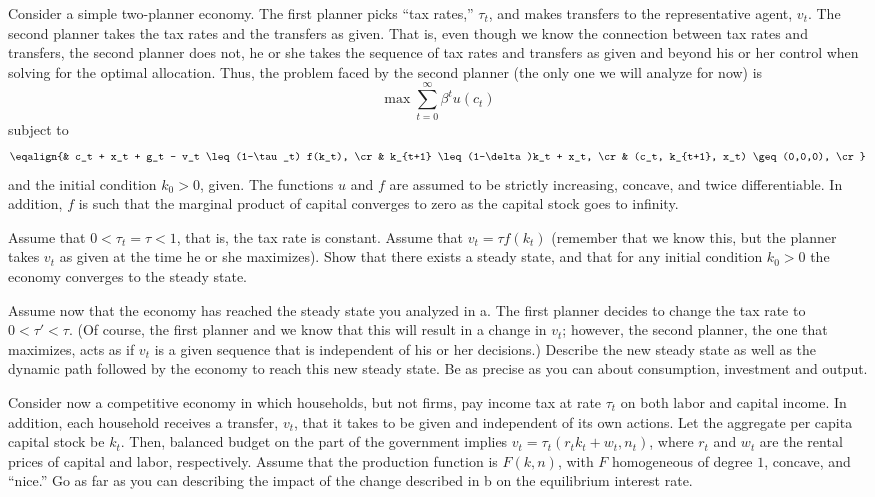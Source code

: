 \medskip
\noindent
Consider a simple two-planner economy.  The first planner picks ``tax rates,''
$\tau_t$,
and makes transfers to the representative
agent, $v_t$.
The second planner takes the tax rates and
the transfers as given.  That is, even though we know the connection between
tax rates and transfers, the second planner does not, he or she takes the sequence
of tax rates and transfers as given and beyond his or her control when solving for
the optimal allocation.  Thus, the problem faced by the second planner (the only
one we will analyze for now) is
$$ \max \sum_{t=0}^\infty \beta^t u(c_t)  $$
subject to
$$\eqalign{& c_t + x_t + g_t - v_t \leq (1-\tau_t) f(k_t), \cr
& k_{t+1} \leq (1-\delta)k_t + x_t,  \cr
& (c_t, k_{t+1}, x_t) \geq (0,0,0),  \cr}  $$
and the initial condition $k_0>0$, given.
The functions $u$ and $f$ are assumed to be strictly increasing,
concave, and twice differentiable.  In addition,
$f$ is such that the marginal product of capital converges to
zero as the capital stock goes to infinity.

\medskip

 Assume that $0<\tau_t = \tau<1$, that is, the tax rate is constant.
Assume that $v_t = \tau f(k_t)$ (remember that we know this,
but the planner takes
$v_t$ as given at the time he or she maximizes).  Show that there exists a steady
state, and that for any initial condition $k_0>0$ the economy converges to the
steady state.
\medskip

 Assume now that the economy has reached
the steady state you analyzed
in a.  The first planner decides to change the tax
rate to $0<\tau' < \tau$.
(Of course, the first planner and we know that this
 will result in a change in
$v_t$; however, the second planner, the one that maximizes,
acts as if $v_t$
is a given sequence that
is independent of his or her decisions.)  Describe the new
steady state as well as the dynamic path followed by the economy to reach this new
steady state.  Be as precise as you can about consumption, investment and output.
\medskip

 Consider now a competitive economy in which households, but not firms,
pay income tax at rate $\tau_t$ on both labor and capital
income.  In addition, each household receives a transfer, $v_t$, that it takes
to be given and independent of its own actions.  Let the aggregate per capita
capital stock be $k_t$.  Then, balanced budget on the part of the government
implies $v_t = \tau_t(r_t k_t + w_t, n_t)$, where $r_t$ and $w_t$ are the
rental prices of capital and labor, respectively.  Assume that the production
function is $F(k,n)$, with $F$ homogeneous of degree $1$, concave, and ``nice.''
Go as far as you can describing the impact of the change described in b on
the equilibrium interest rate.
